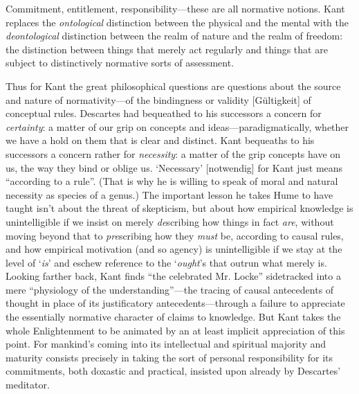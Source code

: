 Commitment, entitlement, responsibility---these are all normative
notions. Kant replaces the \emph{ontological} distinction between the
physical and the mental with the \emph{deontological} distinction
between the realm of nature and the realm of freedom: the distinction
between things that merely act regularly and things that are subject to
distinctively normative sorts of assessment.

Thus for Kant the great philosophical questions are questions about the
source and nature of normativity---of the bindingness or validity
{[}Gültigkeit{]} of conceptual rules. Descartes had bequeathed to his
successors a concern for \emph{certainty}: a matter of our grip on
concepts and ideas---paradigmatically, whether we have a hold on them
that is clear and distinct. Kant bequeaths to his successors a concern
rather for \emph{necessity}: a matter of the grip concepts have on us,
the way they bind or oblige us. `Necessary' {[}notwendig{]} for Kant
just means ``according to a rule''. (That is why he is willing to speak
of moral and natural necessity as species of a genus.) The important
lesson he takes Hume to have taught isn't about the threat of
skepticism, but about how empirical knowledge is unintelligible if we
insist on merely \emph{de}scribing how things in fact \emph{are},
without moving beyond that to \emph{pre}scribing how they \emph{must}
be, according to causal rules, and how empirical motivation (and so
agency) is unintelligible if we stay at the level of `\emph{is}' and
eschew reference to the `\emph{ought}'s that outrun what merely is.
Looking farther back, Kant finds ``the celebrated Mr. Locke''
sidetracked into a mere ``physiology of the understanding''---the
tracing of causal antecedents of thought in place of its justificatory
antecedents---through a failure to appreciate the essentially normative
character of claims to knowledge. But Kant takes the whole Enlightenment
to be animated by an at least implicit appreciation of this point. For
mankind's coming into its intellectual and spiritual majority and
maturity consists precisely in taking the sort of personal
responsibility for its commitments, both doxastic and practical,
insisted upon already by Descartes' meditator.


